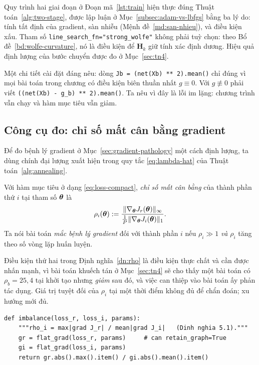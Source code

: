 Quy trình hai giai đoạn ở Đoạn mã~\ref{lst:train} hiện thực đúng
Thuật toán~\ref{alg:two-stage}, được lập luận ở Mục~\ref{subsec:adam-vs-lbfgs}
bằng ba lý do: tính tất định của gradient, sàn nhiễu
(Mệnh đề~\ref{md:san-nhieu}), và điều kiện xấu. Tham số
\texttt{line\_search\_fn="strong\_wolfe"} không phải tuỳ chọn: theo
Bổ đề~\ref{bd:wolfe-curvature}, nó là điều kiện để $\bm{H}_k$ giữ tính xác định
dương. Hiệu quả định lượng của bước chuyển được đo ở Mục~\ref{sec:tn4}.
 
Một chi tiết cài đặt đáng nêu: dòng \texttt{Jb = (net(Xb) ** 2).mean()} chỉ đúng
vì mọi bài toán trong chương có điều kiện biên thuần nhất $g \equiv 0$. Với
$g \not\equiv 0$ phải viết \texttt{((net(Xb) - g\_b) ** 2).mean()}. Ta nêu vì đây
là lỗi im lặng: chương trình vẫn chạy và hàm mục tiêu vẫn giảm.
 
\subsection{Công cụ đo: chỉ số mất cân bằng gradient}
\label{ssec:rho}
 
Để đo bệnh lý gradient ở Mục~\ref{sec:gradient-pathology} một cách định lượng, ta
dùng chính đại lượng xuất hiện trong quy tắc \eqref{eq:lambda-hat} của
Thuật toán~\ref{alg:annealing}.
 
\begin{definition}
\label{dn:rho}
Với hàm mục tiêu ở dạng \eqref{eq:loss-compact}, \emph{chỉ số mất cân bằng} của
thành phần thứ $i$ tại tham số $\bm{\theta}$ là
\begin{equation}
\rho_i(\bm{\theta})
 := \frac{\lVert\nabla_{\bm{\theta}} J_r(\bm{\theta})\rVert_{\infty}}
         {\tfrac{1}{P}\lVert\nabla_{\bm{\theta}} J_i(\bm{\theta})\rVert_{1}} .
\label{eq:rho}
\end{equation}
Ta nói bài toán \emph{mắc bệnh lý gradient} đối với thành phần $i$ nếu
$\rho_i \gg 1$ \emph{và} $\rho_i$ tăng theo số vòng lặp huấn luyện.
\end{definition}
 
Điều kiện thứ hai trong Định nghĩa~\ref{dn:rho} là điều kiện thực chất và cần
được nhấn mạnh, vì bài toán khuếch tán ở Mục~\ref{sec:tn4} sẽ cho thấy một
bài toán có
$\rho_b = 25{,}4$ tại khởi tạo nhưng \emph{giảm} sau đó, và việc can thiệp vào bài
toán ấy phản tác dụng. Giá trị tuyệt đối của $\rho_i$ tại một thời điểm không đủ
để chẩn đoán; xu hướng mới đủ.
 
\begin{lstlisting}[caption={Đo chỉ số mất cân bằng $\rho_i$ theo \eqref{eq:rho}.},label={lst:rho}]
def imbalance(loss_r, loss_i, params):
    """rho_i = max|grad J_r| / mean|grad J_i|   (Dinh nghia 5.1)."""
    gr = flat_grad(loss_r, params)     # can retain_graph=True
    gi = flat_grad(loss_i, params)
    return gr.abs().max().item() / gi.abs().mean().item()
\end{lstlisting}
 
